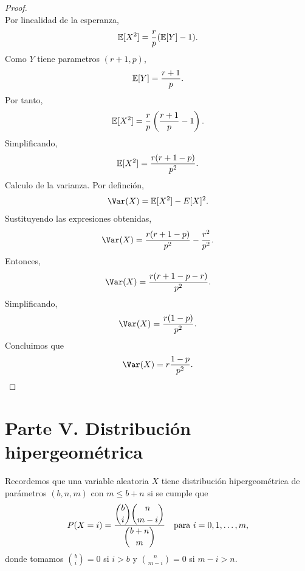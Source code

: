 \documentclass[12pt,a4paper]{article}
\newcommand{\paren}[1]{\left( #1 \right)}
\begin{document}
\begin{proof}
\begin{equation*}
        \end{equation*}
        Por linealidad de la esperanza,
        \begin{equation*}
            \mathbb{E}[X^{2}]=\frac{r}{p}(\mathbb{E}[Y]-1).
        \end{equation*}
        Como $Y$ tiene parametros $(r+1,p)$,
        \begin{equation*}
            \mathbb{E}[Y]=\frac{r+1}{p}.
        \end{equation*}
        Por tanto,
        \begin{equation*}
            \E[X^{2}]=\frac{r}{p}\paren{\frac{r+1}{p}-1}.
        \end{equation*}
        Simplificando,
        \begin{equation*}
            \mathbb{E}[X^{2}]=\frac{r(r+1-p)}{p^{2}}.
        \end{equation*}
        Calculo de la varianza. Por definción,
        \begin{equation*}
            \Var(X)=\E[X^{2}]-E[X]^{2}.
        \end{equation*}
        Sustituyendo las expresiones obtenidas,
        \begin{equation*}
            \Var(X)=\frac{r(r+1-p)}{p^{2}}-\frac{r^{2}}{p^{2}}.
        \end{equation*}
        Entonces,
        \begin{equation*}
            \Var(X)=\frac{r(r+1-p-r)}{p^{2}}.
        \end{equation*}
        Simplificando,
        \begin{equation*}
            \Var(X)=\frac{r(1-p)}{p^{2}}.
        \end{equation*}
        Concluimos que
        \begin{equation*}
            \Var(X)=r\frac{1-p}{p^{2}}.
        \end{equation*}
    \end{proof}

    \section*{Parte V. Distribución hipergeométrica}

    Recordemos que una variable aleatoria $X$ tiene distribución hipergeométrica de parámetros $(b, n, m)$
    con $m \leq b + n$ si se cumple que
    \begin{equation*}
        P(X = i) = \frac{\dbinom{b}{i}\dbinom{n}{m-i}}{\dbinom{b+n}{m}} \quad \text{para } i = 0, 1, \ldots, m,
    \end{equation*}
    donde tomamos $\binom{b}{i} = 0$ si $i > b$ y $\binom{n}{m-i} = 0$ si $m - i > n$.
\end{document}
